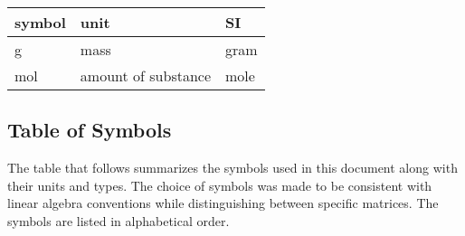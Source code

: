 \documentclass[12pt]{article}
\begin{document}
\renewcommand{\arraystretch}{1.2}
\noindent \begin{tabular}{l l l}
  \toprule
  \textbf{symbol} & \textbf{unit}       & \textbf{SI} \\
  \midrule
  \si{\gram}      & mass                & gram        \\
  \si{\mole}      & amount of substance & mole        \\
  \bottomrule
\end{tabular}


\subsection{Table of Symbols} \label{sec_tabSymbs}

The table that follows summarizes the symbols used in this document along with
their units and types. The choice of symbols was made to be consistent with
linear algebra conventions while distinguishing between specific matrices.  The
symbols are listed in alphabetical order.

\end{document}
